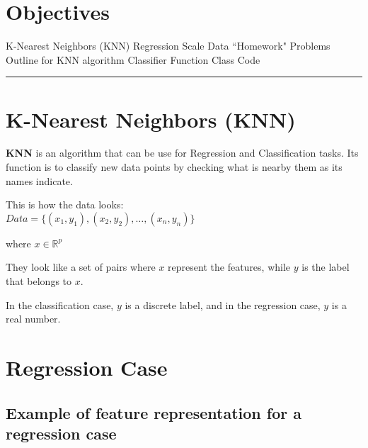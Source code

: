 \section*{Objectives}
\begin{outline}
    \1 K-Nearest Neighbors (KNN)
    \1 Regression
    \1 Scale Data
    \1 ``Homework" Problems
    \1 Outline for KNN algorithm
    \1 Classifier Function
    \1 Class Code
\end{outline}

\rule[0.0051in]{\textwidth}{0.00025in}

\section{K-Nearest Neighbors (KNN)\cite{guo2003knn}}

\textbf{KNN} is an algorithm that can be use for Regression and Classification tasks. Its function is to classify new data points
by checking what is nearby them as its names indicate.

This is how the data looks:\\
$Data = \{(x_1, y_1), (x_2, y_2), \dots, (x_n, y_n)\}$

where $x \in \mathbb{R}^p$

They look like a set of pairs where $x$ represent the features, while $y$ is the label that belongs to $x$.

In the classification case, $y$ is a discrete label, and in the regression case, $y$ is a real number.


\section{Regression Case}

\subsection{Example of feature representation for a regression case}


